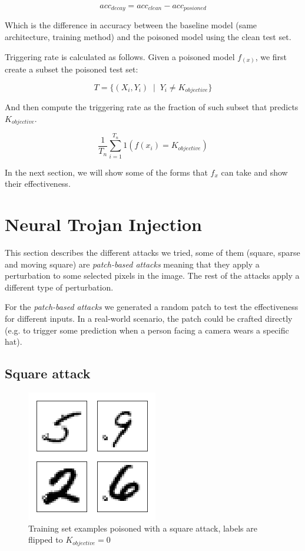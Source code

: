 \documentclass[letterpaper, 10 pt, conference]{ieeeconf}  %
\begin{document}
$$acc_{decay} = acc_{clean} - acc_{posioned}$$

Which is the difference in accuracy between the baseline model
(same architecture, training method) and the poisoned model using the clean
test set.

Triggering rate is calculated as follows. Given a poisoned model $f_(x)$, we
first create a subset the poisoned test set:

$$T = \{(X_i, Y_i) \;\;|\;\;Y_i  \neq K_{objective}\}$$

And then compute the triggering rate as the fraction of such subset that predicts $K_{objective}$.

$$\frac{1}{T_n} \sum_{i=1}^{T_n} 1(f(x_i) = K_{objective})$$

In the next section, we will show some of the forms that $f_x$ can take and show their effectiveness.


\section{Neural Trojan Injection}

This section describes the different attacks we tried, some of them (square,
sparse and moving square) are \textit{patch-based attacks} meaning that they
apply a perturbation to some selected pixels in the image. The rest of the
attacks apply a different type of perturbation.

For the \textit{patch-based attacks} we generated a random patch to test the
effectiveness for different inputs. In a real-world scenario, the patch could
be crafted directly (e.g. to trigger some prediction when a person facing a
camera wears a specific hat).

\subsection{Square attack}

\begin{figure}[h]
\centering
\includegraphics{square.png}
\caption{Training set examples poisoned with a square attack, labels are flipped to $K_{objective}=0$}
\end{figure}
\end{document}
